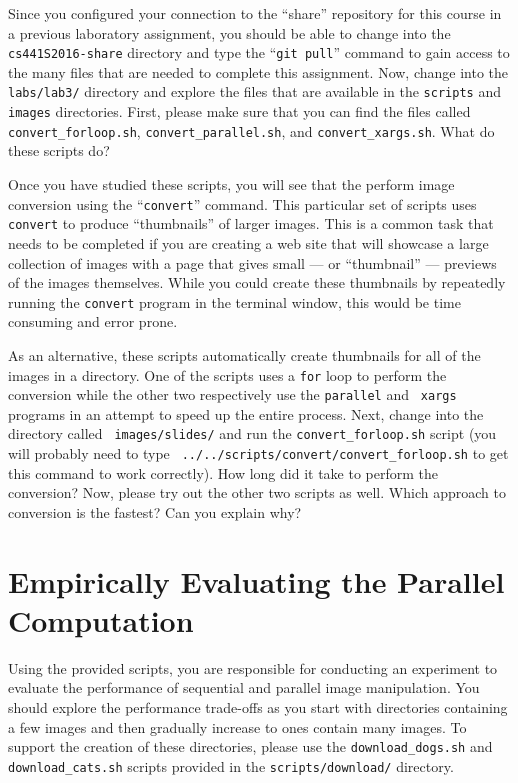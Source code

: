 Since you configured your connection to the ``share'' repository for this course in a previous laboratory assignment,
you should be able to change into the {\tt cs441S2016-share} directory and type the ``{\tt git pull}'' command to gain
access to the many files that are needed to complete this assignment. Now, change into the {\tt labs/lab3/} directory
and explore the files that are available in the {\tt scripts} and {\tt images} directories. First, please make sure that
you can find the files called {\tt convert\_forloop.sh}, {\tt convert\_parallel.sh}, and {\tt convert\_xargs.sh}. What
do these scripts do?

Once you have studied these scripts, you will see that the perform image conversion using the ``{\tt convert}'' command.
This particular set of scripts uses {\tt convert} to produce ``thumbnails'' of larger images. This is a common task that
needs to be completed if you are creating a web site that will showcase a large collection of images with a page that
gives small --- or ``thumbnail'' --- previews of the images themselves. While you could create these thumbnails by
repeatedly running the {\tt convert} program in the terminal window, this would be time consuming and error prone.

As an alternative, these scripts automatically create thumbnails for all of the images in a directory. One of the
scripts uses a {\tt for} loop to perform the conversion while the other two respectively use the {\tt parallel} and {\tt
  xargs} programs in an attempt to speed up the entire process. Next, change into the directory called {\tt
  images/slides/} and run the {\tt convert\_forloop.sh} script (you will probably need to type {\tt
../../scripts/convert/convert\_forloop.sh} to get this command to work correctly). How long did it take to perform the
conversion? Now, please try out the other two scripts as well. Which approach to conversion is the fastest? Can you
explain why?

\section*{Empirically Evaluating the Parallel Computation}

Using the provided scripts, you are responsible for conducting an experiment to evaluate the performance of sequential
and parallel image manipulation. You should explore the performance trade-offs as you start with directories containing
a few images and then gradually increase to ones contain many images. To support the creation of these directories,
please use the {\tt download\_dogs.sh} and {\tt download\_cats.sh} scripts provided in the {\tt scripts/download/}
directory.

